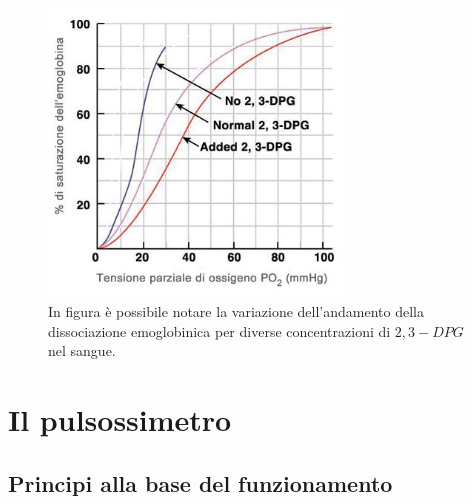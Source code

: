 \documentclass[a4paper, 12pt]{book}
\begin{document}
\begin{figure}[h!]
    \centering
    \includegraphics[width=0.7\textwidth]{emoglobina-dpg.jpeg}
    \caption{In figura è possibile notare la variazione dell'andamento della 							 dissociazione emoglobinica per diverse concentrazioni di $2,3-DPG$ nel 					 sangue.}
    \label{fig:DPG}
\end{figure}

\newpage
\section{Il pulsossimetro}


\subsection{Principi alla base del funzionamento}
\end{document}
